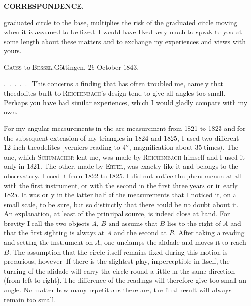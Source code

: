 \par\clearpage
\noindent{}\hfill{\small\textbf{CORRESPONDENCE.}}\hfill\null\par\medskip
\noindent graduated circle to the base, multiplies the risk of the graduated circle moving when it is assumed to be fixed. I would have liked very much to speak to you at some length about these matters and to exchange my experiences and views with yours.
\par\bigskip
\begin{center}{\large\textsc{Gauss} to \textsc{Bessel}.\quad Göttingen, 29 October 1843.}\end{center}
\par\noindent\hspace*{\parindent}.\ .\ .\ .\ .\ .\enspace This concerns a finding that has often troubled me, namely that theodolites built to \textsc{Reichenbach}'s design tend to give all angles too small. Perhaps you have had similar experiences, which I would gladly compare with my own.

\par\noindent\hspace*{\parindent}For my angular measurements in the arc measurement from 1821 to 1823 and for the subsequent extension of my triangles in 1824 and 1825, I used two different 12-inch theodolites (verniers reading to $4''$, magnification about 35 times). The one, which \textsc{Schumacher} lent me, was made by \textsc{Reichenbach} himself and I used it only in 1821. The other, made by \textsc{Ertel}, was exactly like it and belongs to the observatory. I used it from 1822 to 1825. I did not notice the phenomenon at all with the first instrument, or with the second in the first three years or in early 1825. It was only in the latter half of the measurements that I noticed it, on a small scale, to be sure, but so distinctly that there could be no doubt about it. An explanation, at least of the principal source, is indeed close at hand. For brevity I call the two objects $A$, $B$ and assume that $B$ lies to the right of $A$ and that the first sighting is always at $A$ and the second at $B$. After taking a reading and setting the instrument on $A$, one unclamps the alidade and moves it to reach $B$. The assumption that the circle itself remains  fixed during this motion is precarious, however. If there is the slightest play, imperceptible in itself, the turning of the alidade will carry the circle round a little in the same direction (from left to right). The difference of the readings will therefore give too small an angle. No matter how many repetitions there are, the final result will always remain too small.

